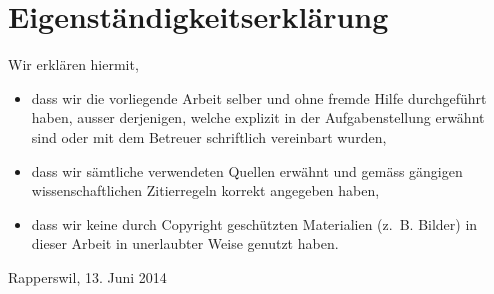 \chapter{Eigenständigkeitserklärung}

Wir erklären hiermit, 

\begin{itemize}
	\item	dass wir die vorliegende Arbeit selber und ohne fremde Hilfe
		durchgeführt haben, ausser derjenigen, welche explizit in der
		Aufgabenstellung erwähnt sind oder mit dem Betreuer schriftlich vereinbart
		wurden,
	\item	dass wir sämtliche verwendeten Quellen erwähnt und gemäss gängigen
		wissenschaftlichen Zitierregeln korrekt angegeben haben,
	\item dass wir keine durch Copyright geschützten Materialien (z.~B. Bilder) in
		dieser Arbeit in unerlaubter Weise genutzt haben. 
\end{itemize}

\vspace{4mm}

Rapperswil, 13. Juni 2014

\vspace{6mm}

